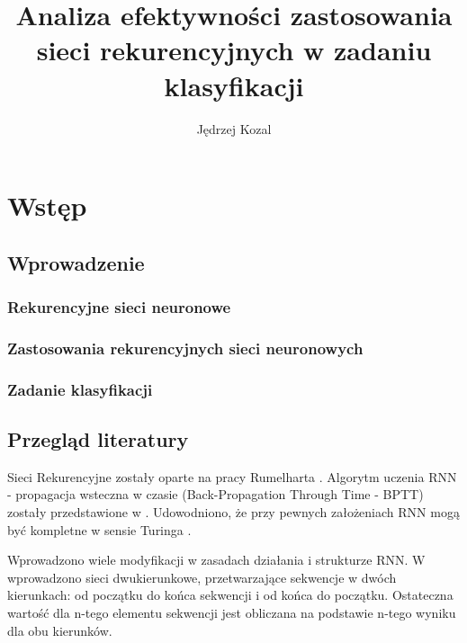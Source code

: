\documentclass[oneside, mag]{mgr}
\title{Analiza efektywności zastosowania sieci rekurencyjnych w zadaniu klasyfikacji}
\author{Jędrzej Kozal}
\begin{document}
	

\maketitle

\chapter{Wstęp}

\section{Wprowadzenie}

\subsection{Rekurencyjne sieci neuronowe}

\subsection{Zastosowania rekurencyjnych sieci neuronowych}

\subsection{Zadanie klasyfikacji}

\cite{Goodfellow-et-al-2016}

\section{Przegląd literatury}

Sieci Rekurencyjne zostały oparte na pracy Rumelharta \cite{RNN}. Algorytm uczenia RNN - propagacja wsteczna w czasie (Back-Propagation Through Time - BPTT) zostały przedstawione w \cite{BPTT}.
Udowodniono, że przy pewnych założeniach RNN mogą być kompletne w sensie Turinga \cite{turing-complete}.

Wprowadzono wiele modyfikacji w zasadach działania i strukturze RNN. 
W \cite{bidirectional} wprowadzono sieci dwukierunkowe, przetwarzające sekwencje w dwóch kierunkach: od początku do końca sekwencji i od końca do początku. Ostateczna wartość dla n-tego elementu sekwencji jest obliczana na podstawie n-tego wyniku dla obu kierunków.
\end{document}
